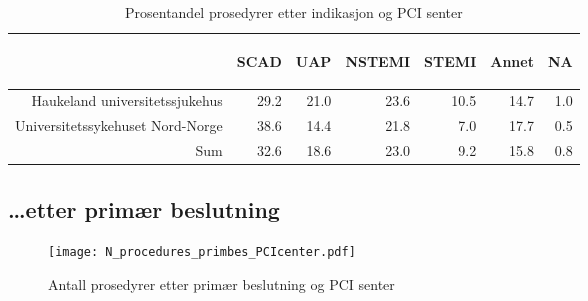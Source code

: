 \documentclass[norsk, a4paper]{report}
\begin{document}
\begin{tiny}
\begin{table}[ht]
\centering
\begin{tabular}{rrrrrrr}
  \toprule
 & \begin{sideways} SCAD \end{sideways} & \begin{sideways} UAP \end{sideways} & \begin{sideways} NSTEMI \end{sideways} & \begin{sideways} STEMI \end{sideways} & \begin{sideways} Annet \end{sideways} & \begin{sideways} NA \end{sideways} \\ 
  \midrule
Haukeland universitetssjukehus & 29.2 & 21.0 & 23.6 & 10.5 & 14.7 & 1.0 \\ 
  Universitetssykehuset Nord-Norge & 38.6 & 14.4 & 21.8 & 7.0 & 17.7 & 0.5 \\ 
  Sum & 32.6 & 18.6 & 23.0 & 9.2 & 15.8 & 0.8 \\ 
   \bottomrule
\end{tabular}
\caption{Prosentandel prosedyrer etter indikasjon og PCI senter} 
\label{tab:pros:ind}
\end{table}\end{tiny}



\clearpage
\subsection{\ldots etter primær beslutning}


\begin{figure}[ht]
  \centering
\texttt{[image: N\_procedures\_primbes\_PCIcenter.pdf]}  \caption{Antall prosedyrer etter primær beslutning og PCI senter}
\end{figure}
\end{document}
